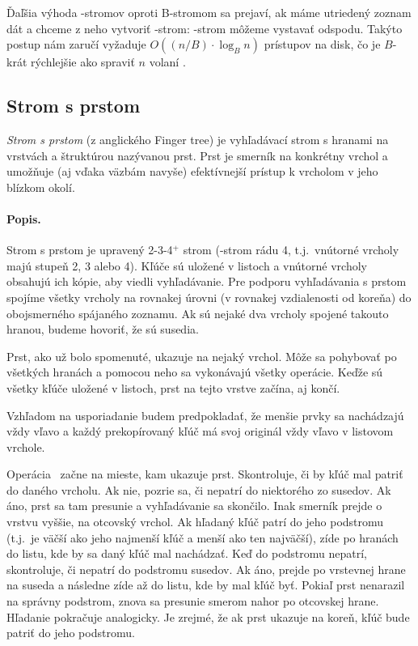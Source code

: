 Ďaľšia výhoda \Bp-stromov oproti B-stromom sa prejaví, ak máme utriedený zoznam dát a chceme z neho vytvoriť \Bp-strom:
\Bp-strom môžeme vystavať odspodu. Takýto postup nám zaručí vyžaduje $O((n/B)\cdot\log_B n)$ prístupov na disk,
čo je $B$-krát rýchlejšie ako spraviť $n$ volaní \ins.




\subsection{Strom s prstom}
\emph{Strom s prstom} (z anglického Finger tree) je vyhľadávací strom s hranami na vrstvách a štruktúrou 
nazývanou prst. Prst je smerník na konkrétny vrchol a umožňuje (aj vďaka väzbám navyše) efektívnejší 
prístup k vrcholom v jeho blízkom okolí.

\paragraph{Popis.}
Strom s prstom je upravený 2-3-4$^+$ strom (\Bp-strom rádu 4, t.j.\ vnútorné vrcholy
majú stupeň 2, 3 alebo 4). Kľúče sú uložené v listoch a vnútorné vrcholy
obsahujú ich kópie, aby viedli vyhľadávanie. Pre podporu vyhľadávania
s prstom spojíme všetky vrcholy na rovnakej úrovni (v rovnakej vzdialenosti od koreňa)
do obojsmerného spájaného zoznamu.
Ak sú nejaké dva vrcholy spojené takouto hranou, budeme hovoriť, že sú susedia.

Prst, ako už bolo spomenuté, ukazuje na nejaký vrchol. Môže sa pohybovať po všetkých hranách
a pomocou neho sa vykonávajú všetky operácie. Keďže sú všetky kľúče uložené v listoch, prst
na tejto vrstve začína, aj končí.

Vzhľadom na usporiadanie budem predpokladať, že menšie prvky sa nachádzajú vždy vľavo a každý
prekopírovaný kľúč má svoj originál vždy vľavo v listovom vrchole.


Operácia \find\ začne na mieste, kam ukazuje prst. Skontroluje, či by kľúč mal patriť do daného
vrcholu. Ak nie, pozrie sa, či nepatrí do niektorého zo susedov. Ak áno, prst sa tam presunie
a vyhľadávanie sa skončilo. Inak smerník prejde o vrstvu vyššie, na otcovský vrchol. Ak hľadaný
kľúč patrí do jeho podstromu (t.j.\ je väčší ako jeho najmenší kľúč a menší ako ten najväčší),
zíde po hranách do listu, kde by sa daný kľúč mal nachádzať. Keď do podstromu nepatrí, skontroluje,
či nepatrí do podstromu susedov. Ak áno, prejde po vrstevnej hrane na suseda a následne zíde až
do listu, kde by mal kľúč byť. Pokiaľ prst nenarazil na správny podstrom, znova sa presunie smerom
nahor po otcovskej hrane. Hľadanie pokračuje analogicky. Je zrejmé, že ak prst ukazuje na koreň,
kľúč bude patriť do jeho podstromu.


